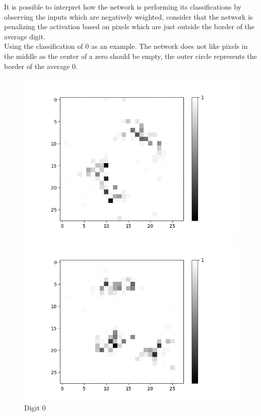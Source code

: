 It is possible to interpret how the network is performing its classifications by observing the inputs which are negatively weighted, consider that the network is penalizing the activation based on pixels which are just outside the border of the average digit.\\

Using the classification of 0 as an example. The network does not like pixels in the middle as the center of a zero should be empty, the outer circle represents the border of the average 0.

\begin{figure}[H]
	\captionsetup{labelformat=empty}
	\centering
	\begin{minipage}[b]{0.19\textwidth}
		\includegraphics[width=\textwidth]{AND(LSM)/Positive/Layer0-Neuron-0.png}
		\caption{Digit 0}
	\end{minipage}
	\begin{minipage}[b]{0.19\textwidth}
		\includegraphics[width=\textwidth]{AND(LSM)/Positive/Layer0-Neuron-2.png}

\end{minipage}
\end{figure}
